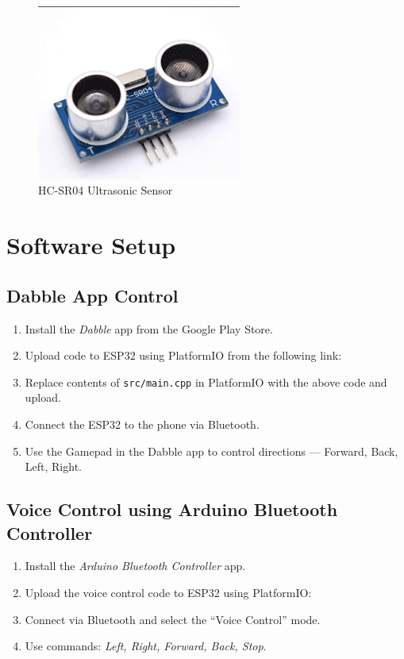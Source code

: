 \documentclass[a4paper,12pt]{article}
\begin{document}
\begin{figure}[!h]
\centering
\includegraphics[width=0.6\textwidth]{ultrasonic_sensor.jpg}
\caption{HC-SR04 Ultrasonic Sensor}
\label{fig:ultrasonic}
\end{figure}

\section{Software Setup}

\subsection{Dabble App Control}
\begin{enumerate}
\item Install the {\em Dabble} app from the Google Play Store.
\item Upload code to ESP32 using PlatformIO from the following link:
\item Replace contents of \texttt{src/main.cpp} in PlatformIO with the above code and upload.
\item Connect the ESP32 to the phone via Bluetooth.
\item Use the Gamepad in the Dabble app to control directions — Forward, Back, Left, Right.
\end{enumerate}

\subsection{Voice Control using Arduino Bluetooth Controller}
\begin{enumerate}
\item Install the {\em Arduino Bluetooth Controller} app.
\item Upload the voice control code to ESP32 using PlatformIO:
\item Connect via Bluetooth and select the “Voice Control” mode.
\item Use commands: \textit{Left, Right, Forward, Back, Stop}.
\end{enumerate}
\end{document}
